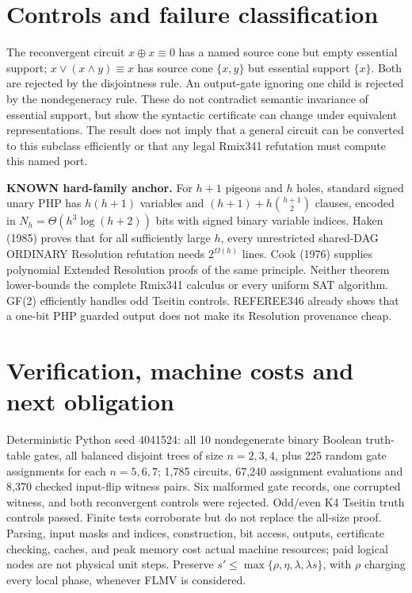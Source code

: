 \documentclass[11pt]{article}
\begin{document}
\section*{Controls and failure classification}
The reconvergent circuit \(x\oplus x\equiv0\) has a named source cone but empty essential support; \(x\lor(x\land y)\equiv x\) has source cone \(\{x,y\}\) but essential support \(\{x\}\). Both are rejected by the disjointness rule. An output-gate ignoring one child is rejected by the nondegeneracy rule. These do not contradict semantic invariance of essential support, but show the syntactic certificate can change under equivalent representations. The result does not imply that a general circuit can be converted to this subclass efficiently or that any legal Rmix341 refutation must compute this named port.

\noindent\textbf{KNOWN hard-family anchor.} For \(h+1\) pigeons and \(h\) holes, standard signed unary PHP has \(h(h+1)\) variables and \((h+1)+h\binom{h+1}{2}\) clauses, encoded in \(N_h=\Theta(h^3\log(h+2))\) bits with signed binary variable indices. Haken (1985) proves that for all sufficiently large \(h\), every unrestricted shared-DAG ORDINARY Resolution refutation needs \(2^{\Omega(h)}\) lines. Cook (1976) supplies polynomial Extended Resolution proofs of the same principle. Neither theorem lower-bounds the complete Rmix341 calculus or every uniform SAT algorithm. GF(2) efficiently handles odd Tseitin controls. REFEREE346 already shows that a one-bit PHP guarded output does not make its Resolution provenance cheap.

\section*{Verification, machine costs and next obligation}
Deterministic Python seed 4041524: all 10 nondegenerate binary Boolean truth-table gates, all balanced disjoint trees of size \(n=2,3,4\), plus 225 random gate assignments for each \(n=5,6,7\); 1,785 circuits, 67,240 assignment evaluations and 8,370 checked input-flip witness pairs. Six malformed gate records, one corrupted witness, and both reconvergent controls were rejected. Odd/even K4 Tseitin truth controls passed. Finite tests corroborate but do not replace the all-size proof. Parsing, input masks and indices, construction, bit access, outputs, certificate checking, caches, and peak memory cost actual machine resources; paid logical nodes are not physical unit steps. Preserve \(s'\le\max\{\rho,\eta,\lambda,\lambda s\}\), with \(\rho\) charging every local phase, whenever FLMV is considered.
\end{document}
